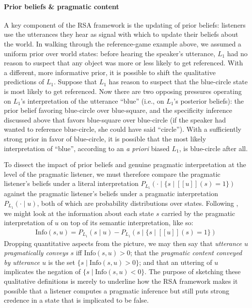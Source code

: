 \documentclass{sp}
\newcommand{\sem}[1]{\ensuremath{[\![#1]\!]}}
\begin{document}
\paragraph{Prior beliefs \& pragmatic content}
A key component of the RSA framework is the updating of prior beliefs: listeners use the utterances they hear as signal with which to update their beliefs about the world.
In walking through the reference-game example above, we assumed a uniform prior over world states: before hearing the speaker's utterance, $L_1$ had no reason to suspect that any object was more or less likely to get referenced.
With a different, more informative prior, it is possible to shift the qualitative predictions of $L_1$.
Suppose that $L_1$ has reason to suspect that the blue-circle state is most likely to get referenced.
Now there are two opposing pressures operating on $L_1$'s interpretation of the utterance ``blue'' (i.e., on $L_1$'s posterior beliefs): the prior belief favoring blue-circle over blue-square, and the specificity inference discussed above that favors blue-square over blue-circle (if the speaker had wanted to reference blue-circle, she could have said ``circle'').
With a sufficiently strong prior in favor of blue-circle, it is possible that the most likely interpretation of ``blue'', according to an \emph{a priori} biased $L_1$, is blue-circle after all.

To dissect the impact of prior beliefs and genuine pragmatic interpretation at the level of the pragmatic listener, we must therefore compare the pragmatic listener's beliefs under a literal interpretation $P_{L_{1}}(\cdot \mid \{s
\mid \sem {u}(s)=1\})$ against the pragmatic listener's beliefs under a pragmatic interpretation $P_{L_{1}}(\cdot \mid u)$, both of which are probability distributions over states.
Following \cite{Skyrms2010:Signals}, we might look at the information about each state $s$ carried by the pragmatic interpretation of $u$ on top of its semantic interpretation, like so:
\begin{align*}
  \text{Info}(s, u) = { P_{L_{1}}(s \mid u) }
  -
  { P_{L_{1}}(s \mid \{s \mid \sem{u}(s)=1\}) }
\end{align*}
Dropping quantitative aspects from the picture, we may then say that \emph{utterance $u$ pragmatically conveys $s$} iff $\text{Info}(s,u) > 0$; that the \emph{pragmatic content conveyed by utterance $u$} is the set $\{s \mid \text{Info}(s,u) > 0\}$; and that an uttering of $u$ implicates the negation of $\{s \mid \text{Info}(s,u) < 0\}$.
The purpose of sketching these qualitative definitions is merely to underline how the RSA framework makes it possible that a listener computes a pragmatic inference but still puts strong credence in a state that is implicated to be false.
\end{document}
